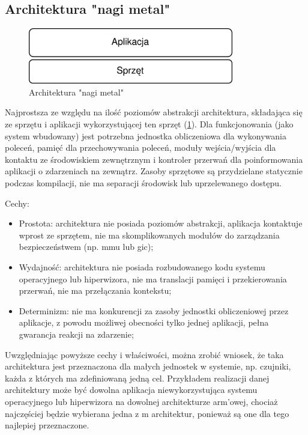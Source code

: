 \documentclass[../../main]{subfiles}
\begin{document}
\subsection{Architektura "nagi metal"}
\begin{figure}[h]
    \centering
    \includegraphics[width=0.8\textwidth]{Images/bare-metal.png}
    \caption{Architektura "nagi metal"}
    \label{fig:bare-metal}
\end{figure}

Najprostsza ze względu na ilość poziomów abstrakcji architektura, składająca się ze sprzętu i aplikacji
wykorzystującej ten sprzęt (\cref{fig:bare-metal}). Dla funkcjonowania (jako system wbudowany) jest
potrzebna jednostka obliczeniowa dla wykonywania poleceń, pamięć dla przechowywania poleceń, moduły
wejścia/wyjścia dla kontaktu ze środowiskiem zewnętrznym i kontroler przerwań dla poinformowania
aplikacji o zdarzeniach na zewnątrz. Zasoby sprzętowe są przydzielane statycznie podczas kompilacji,
nie ma separacji środowisk lub uprzelewanego dostępu. %

Cechy:
\begin{itemize}
    \item Prostota: architektura nie posiada poziomów abstrakcji, aplikacja kontaktuje wprost ze
    sprzętem, nie ma skomplikowanych modułów do zarządzania bezpieczeństwem (np. \acrshort{mmu} lub
    \acrshort{gic});
    \item Wydajność: architektura nie posiada rozbudowanego kodu systemu operacyjnego lub
    hiperwizora, nie ma translacji pamięci i przekierowania przerwań, nie ma przełączania kontekstu;
    \item Determinizm: nie ma konkurencji za zasoby jednostki obliczeniowej przez aplikacje, z powodu
    możliwej obecności tylko jednej aplikacji, pełna gwarancja reakcji na zdarzenie;
\end{itemize}

Uwzględniając powyższe cechy i właściwości, można zrobić wniosek, że taka architektura jest
przeznaczona dla małych jednostek w systemie, np. czujniki, każda z których ma zdefiniowaną jedną cel.
Przykładem realizacji danej architektury może być dowolna aplikacja niewykorzystująca systemu
operacyjnego lub hiperwizora na dowolnej architekturze \acrshort{arm}'owej, chociaż najczęściej będzie
wybierana jedna z \acrshort{m} architektur, ponieważ są one dla tego najlepiej przeznaczone.
\end{document}
